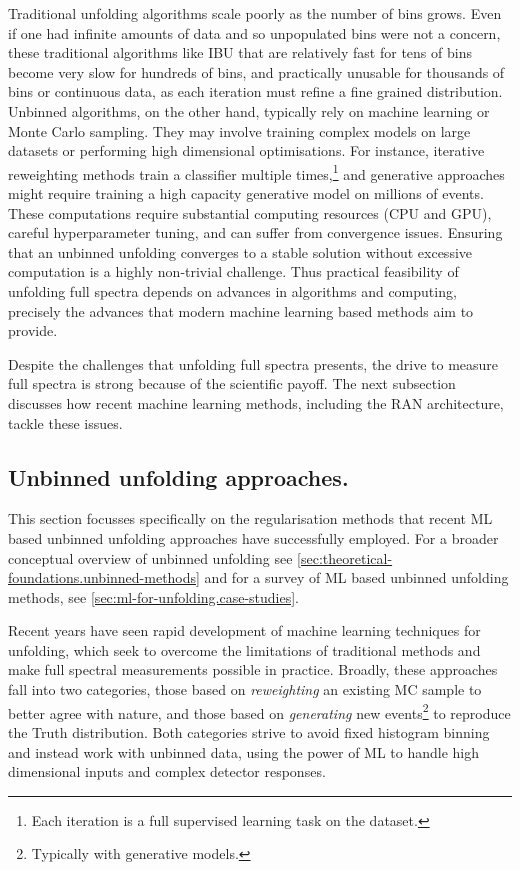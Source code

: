 {        Traditional unfolding algorithms scale poorly as the number of bins grows.
        Even if one had infinite amounts of data and so unpopulated bins were not a concern, these traditional algorithms like IBU that are relatively fast for tens of bins become very slow for hundreds of bins, and practically unusable for thousands of bins or continuous data, as each iteration must refine a fine grained distribution.
        Unbinned algorithms, on the other hand, typically rely on machine learning or Monte Carlo sampling.
        They may involve training complex models on large datasets or performing high dimensional optimisations.
        For instance, iterative reweighting methods train a classifier multiple times,\footnote{Each iteration is a full supervised learning task on the dataset.} and generative approaches might require training a high capacity generative model on millions of events.
        These computations require substantial computing resources (CPU and GPU), careful hyperparameter tuning, and can suffer from convergence issues.
        Ensuring that an unbinned unfolding converges to a stable solution without excessive computation is a highly non-trivial challenge.
        Thus practical feasibility of unfolding full spectra depends on advances in algorithms and computing, precisely the advances that modern machine learning based methods aim to provide.
        
        Despite the challenges that unfolding full spectra presents, the drive to measure full spectra is strong because of the scientific payoff.
        The next subsection discusses how recent machine learning methods, including the RAN architecture, tackle these issues.

    \subsection{Unbinned unfolding approaches.}
    \begin{note*}
        This section focusses specifically on the regularisation methods that recent ML based unbinned unfolding approaches have successfully employed. For a broader conceptual overview of unbinned unfolding see \cref{sec:theoretical-foundations.unbinned-methods} and for a survey of ML based unbinned unfolding methods, see \cref{sec:ml-for-unfolding.case-studies}.
    \end{note*}
    
        Recent years have seen rapid development of machine learning techniques for unfolding, which seek to overcome the limitations of traditional methods and make full spectral measurements possible in practice.
        Broadly, these approaches fall into two categories, those based on \textit{reweighting} an existing MC sample to better agree with nature, and those based on \textit{generating} new events\footnote{Typically with generative models.} to reproduce the Truth distribution.
        Both categories strive to avoid fixed histogram binning and instead work with unbinned data, using the power of ML to handle high dimensional inputs and complex detector responses.

}
